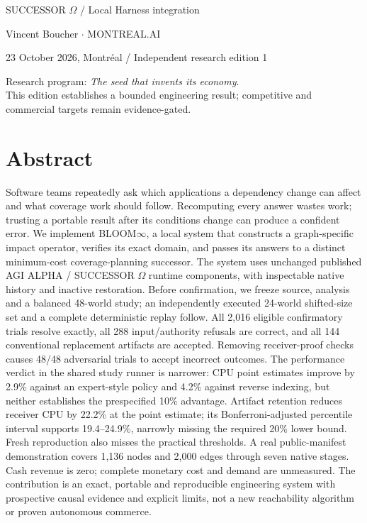 \documentclass[11pt,letterpaper]{article}
\newcommand{\bloom}{\textsc{BLOOM}$\infty$}
\begin{document}
\begin{titlepage}
\begin{minipage}{0.78\textwidth}
\end{minipage}
\vfill
{\small{}}\par
{\small SUCCESSOR $\Omega$ \enspace / \enspace Local Harness integration}\par
\vspace{0.28in}
{\large Vincent Boucher \enspace $\cdot$ \enspace MONTREAL.AI}\par
{\small 23 October 2026, Montr\'eal \quad / \quad Independent research edition 1}\par
\vspace{0.15in}
{\footnotesize Research program: \emph{The seed that invents its economy}.\\This edition establishes a bounded engineering result; competitive and commercial targets remain evidence-gated.}
\end{titlepage}
\setcounter{page}{1}
\hypersetup{pageanchor=true}
\section*{Abstract}
Software teams repeatedly ask which applications a dependency change can affect and what coverage work should follow. Recomputing every answer wastes work; trusting a portable result after its conditions change can produce a confident error. We implement \bloom, a local system that constructs a graph-specific impact operator, verifies its exact domain, and passes its answers to a distinct minimum-cost coverage-planning successor. The system uses unchanged published AGI ALPHA / SUCCESSOR $\Omega$ runtime components, with inspectable native history and inactive restoration. Before confirmation, we freeze source, analysis and a balanced 48-world study; an independently executed 24-world shifted-size set and a complete deterministic replay follow. All 2,016 eligible confirmatory trials resolve exactly, all 288 input/authority refusals are correct, and all 144 conventional replacement artifacts are accepted. Removing receiver-proof checks causes 48/48 adversarial trials to accept incorrect outcomes. The performance verdict in the shared study runner is narrower: CPU point estimates improve by 2.9\% against an expert-style policy and 4.2\% against reverse indexing, but neither establishes the prespecified 10\% advantage. Artifact retention reduces receiver CPU by 22.2\% at the point estimate; its Bonferroni-adjusted percentile interval supports 19.4--24.9\%, narrowly missing the required 20\% lower bound. Fresh reproduction also misses the practical thresholds. A real public-manifest demonstration covers 1,136 nodes and 2,000 edges through seven native stages. Cash revenue is zero; complete monetary cost and demand are unmeasured. The contribution is an exact, portable and reproducible engineering system with prospective causal evidence and explicit limits, not a new reachability algorithm or proven autonomous commerce.
\end{document}
